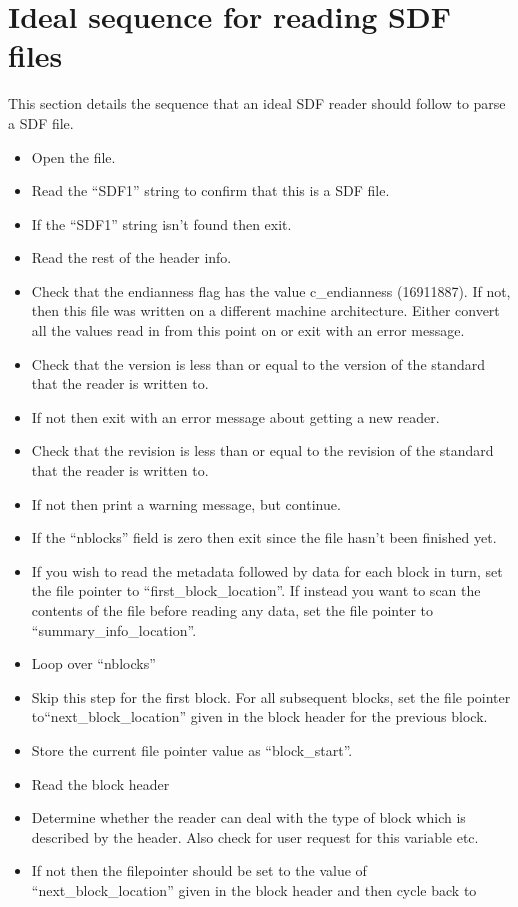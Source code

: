 \documentclass[12pt]{article}
\newcommand{\subsec}{\section}
\begin{document}
\subsec{Ideal sequence for reading SDF files}
This section details the sequence that an ideal SDF reader should follow to
parse a SDF file.
\begin{itemize}
\item Open the file.
\item Read the ``SDF1'' string to confirm that this is a SDF file.
\item If the ``SDF1'' string isn't found then exit.
\item Read the rest of the header info.
\item Check that the endianness flag has the value c\_endianness (16911887).
  If not, then this file was written on a different machine architecture.
  Either convert all the values read in from this point on or exit with an
  error message.
\item Check that the version is less than or equal to the version of the
  standard that the reader is written to.
\item If not then exit with an error message about getting a new reader.
\item Check that the revision is less than or equal to the revision of the
  standard that the reader is written to.
\item If not then print a warning message, but continue.
\item If the ``nblocks'' field is zero then exit since the file hasn't been
  finished yet.
\item If you wish to read the metadata followed by data for each block in
  turn, set the file pointer to ``first\_block\_location''. If instead you want
  to scan the contents of the file before reading any data, set the file
  pointer to ``summary\_info\_location''.
\item Loop over ``nblocks''
\item Skip this step for the first block. For all subsequent blocks, set the
  file pointer to\linebreak ``next\_block\_location'' given in the block header
  for the previous block.
\item Store the current file pointer value as ``block\_start''.
\item Read the block header
\item Determine whether the reader can deal with the type of block which is
  described by the header. Also check for user request for this variable etc.
\item If not then the filepointer should be set to the value of
  ``next\_block\_location'' given in the block header and then cycle back to

\end{itemize}
\end{document}
